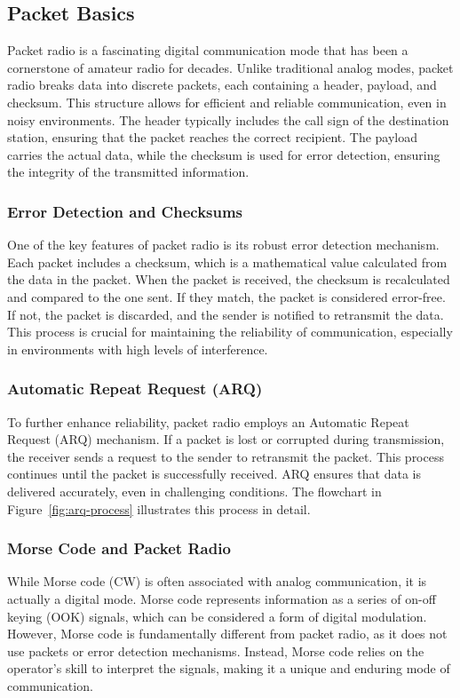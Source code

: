 \subsection{Packet Basics}
\label{subsec:packet-basics}

Packet radio is a fascinating digital communication mode that has been a cornerstone of amateur radio for decades. Unlike traditional analog modes, packet radio breaks data into discrete packets, each containing a header, payload, and checksum. This structure allows for efficient and reliable communication, even in noisy environments. The header typically includes the call sign of the destination station, ensuring that the packet reaches the correct recipient. The payload carries the actual data, while the checksum is used for error detection, ensuring the integrity of the transmitted information.

\subsubsection*{Error Detection and Checksums}
One of the key features of packet radio is its robust error detection mechanism. Each packet includes a checksum, which is a mathematical value calculated from the data in the packet. When the packet is received, the checksum is recalculated and compared to the one sent. If they match, the packet is considered error-free. If not, the packet is discarded, and the sender is notified to retransmit the data. This process is crucial for maintaining the reliability of communication, especially in environments with high levels of interference.

\subsubsection*{Automatic Repeat Request (ARQ)}
To further enhance reliability, packet radio employs an Automatic Repeat Request (ARQ) mechanism. If a packet is lost or corrupted during transmission, the receiver sends a request to the sender to retransmit the packet. This process continues until the packet is successfully received. ARQ ensures that data is delivered accurately, even in challenging conditions. The flowchart in Figure~\ref{fig:arq-process} illustrates this process in detail.

\subsubsection*{Morse Code and Packet Radio}
While Morse code (CW) is often associated with analog communication, it is actually a digital mode. Morse code represents information as a series of on-off keying (OOK) signals, which can be considered a form of digital modulation. However, Morse code is fundamentally different from packet radio, as it does not use packets or error detection mechanisms. Instead, Morse code relies on the operator's skill to interpret the signals, making it a unique and enduring mode of communication.

